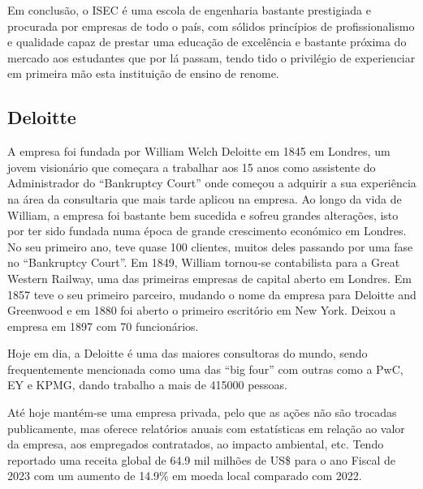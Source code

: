         Em conclusão, o ISEC é uma escola de engenharia bastante prestigiada e procurada por empresas de todo o país, com sólidos princípios de profissionalismo e qualidade capaz de prestar uma educação de excelência e bastante próxima do mercado aos estudantes que por lá passam, tendo tido o privilégio de experienciar em primeira mão esta instituição de ensino de renome.
    
    
    \subsection{Deloitte}\label{subsec:deloitte}

    
        A empresa foi fundada por William Welch Deloitte em 1845 em Londres, um jovem visionário que começara a trabalhar aos 15 anos como assistente do Administrador do ``Bankruptcy Court'' onde começou a adquirir a sua experiência na área da consultaria que mais tarde aplicou na empresa. 
        Ao longo da vida de William, a empresa foi bastante bem sucedida e sofreu grandes alterações, isto por ter sido fundada numa época de grande crescimento económico em Londres. No seu primeiro ano, teve quase 100 clientes, muitos deles passando por uma fase no ``Bankruptcy Court''. Em 1849, William tornou-se contabilista para a Great Western Railway, uma das primeiras empresas de capital aberto em Londres\cite{william-deloitte}. Em 1857 teve o seu primeiro parceiro, mudando o nome da empresa para Deloitte and Greenwood e em 1880 foi aberto o primeiro escritório em New York\cite{deloitte-uk-history-yt}. Deixou a empresa em 1897 com 70 funcionários\cite{william-deloitte}.
    
        Hoje em dia, a Deloitte é uma das maiores consultoras do mundo, sendo frequentemente mencionada como uma das ``big four'' com outras como a PwC, EY e KPMG\cite{euronews-bigfour}, dando trabalho a mais de \num{415000} pessoas\cite{deloitte-stats}.
    
        Até hoje mantém-se uma empresa privada, pelo que as ações não são trocadas publicamente, mas oferece relatórios anuais com estatísticas em relação ao valor da empresa, aos empregados contratados, ao impacto ambiental, etc.
        Tendo reportado uma receita global de \num{64.9} mil milhões de US\$ para o ano Fiscal de 2023 com um aumento de 14.9\% em moeda local comparado com 2022\cite{deloitte_in_2023}.
        
    
